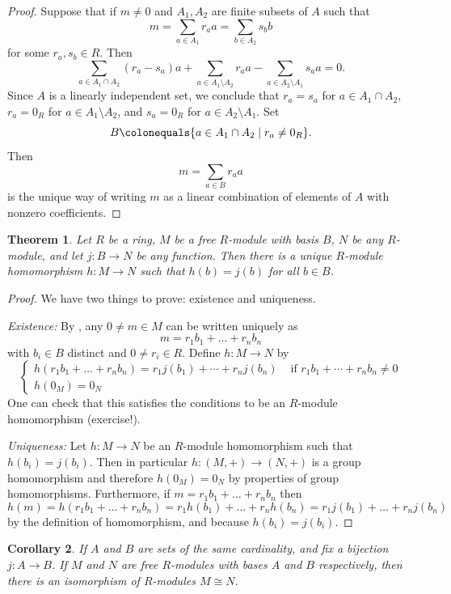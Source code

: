 \documentclass[12pt]{report}
\newtheorem{theorem}{Theorem}[chapter]
\newtheorem{corollary}[theorem]{Corollary}
\numberwithin{equation}{section}
\numberwithin{theorem}{chapter}
\theoremstyle{definition}
\newtheorem*{basic properties}{Basic Properties}
\newtheorem*{Important Remark}{Important Remark}
\begin{document}
\begin{proof}
Suppose that if $m\neq 0$ and $A_1,A_2$ are finite subsets of $A$ such that 
$$m=\sum_{a\in A_1}r_aa=\sum_{b\in A_2}s_bb$$
for some $r_a, s_b \in R$.
Then
$$\sum_{a\in A_1\cap A_2} (r_a-s_a)a+\sum_{a\in A_1\setminus A_2} r_aa-\sum_{a \in A_2\setminus A_1} s_aa=0.$$
Since $A$ is a linearly independent set, we conclude that $r_a=s_a$ for $a\in A_1\cap A_2$, $r_a=0_R$ for $a\in A_1\setminus A_2$, and $s_a=0_R$ for $a \in A_2\setminus A_1$. Set 
$$B \colonequals \{a \in A_1\cap A_2 \mid r_a \neq 0_R\}.$$ 
Then 
$$m = \displaystyle\sum_{a\in B}r_aa$$
is the unique way of writing $m$ as a linear combination of elements of $A$ with nonzero coefficients.
\end{proof}




\begin{theorem}\label{UMPfreemod}
 Let $R$ be a ring, $M$ be a free $R$-module with basis $B$, $N$ be any $R$-module, and let $j: B \to N$ be any function. Then there is a unique $R$-module homomorphism $h: M \to N$ such that $h(b) = j(b)$ for all $b \in B$.
\end{theorem}


\begin{proof}
We have two things to prove: existence and uniqueness.

\noindent
{\em Existence:} By , any $0\neq m\in M$ can be written uniquely as 
$$m=r_1b_1+\dots+r_nb_n$$ 
with $b_i\in B$ distinct and $0 \neq r_i \in R$. Define $h\!: M \to N$ by
$$\begin{cases}
h(r_1b_1+\dots+r_nb_n) = r_1j(b_1) + \cdots +r_nj(b_n) & \text{ if } r_1b_1 + \cdots + r_nb_n \neq 0\\
h(0_M)=0_N
\end{cases}$$
One can check that this satisfies the conditions to be an $R$-module homomorphism (exercise!).

{\em Uniqueness:} Let $h:M\to N$ be an $R$-module homomorphism such that $h(b_i)=j(b_i)$. Then in particular $h\!:(M,+)\to (N,+)$ is a group homomorphism and therefore $h(0_M)=0_N$ by properties of group homomorphisms. Furthermore, if $m=r_1b_1+\dots+r_nb_n$ then 
$$h(m)=h(r_1b_1+\dots+r_nb_n)=r_1h(b_1)+\dots+r_nh(b_n)=r_1j(b_1)+\dots+r_nj(b_n)$$ 
by the definition of homomorphism, and because $h(b_i)=j(b_i)$. 
\end{proof}



\begin{corollary}\label{bijective bases implies iso}
If $A$ and $B$ are sets of the same cardinality, and fix a bijection $j:A\to B$. If $M$ and $N$ are free $R$-modules with bases $A$ and $B$ respectively, then there is an isomorphism of $R$-modules $M \cong N$.
\end{corollary}
\end{document}
